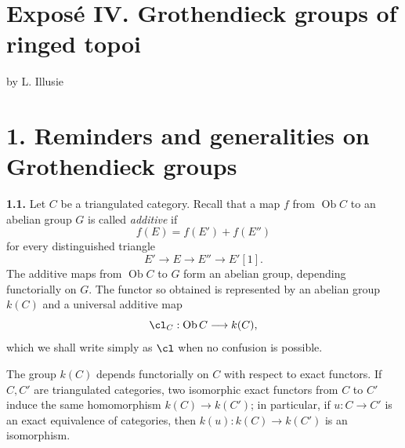 \providecommand{\Ob}{\operatorname{Ob}}
\providecommand{\Mod}{\operatorname{Mod}}
\providecommand{\Coh}{\operatorname{Coh}}
\providecommand{\Loclib}{\operatorname{Loclib}}
\providecommand{\coh}{\mathrm{coh}}
\providecommand{\parf}{\mathrm{parf}}
\providecommand{\naif}{\mathrm{naif}}
\providecommand{\loc}{\mathrm{loc}}
\providecommand{\fin}{\mathrm{fin}}
\providecommand{\clA}{\operatorname{cl}}
\providecommand{\Rg}{\operatorname{rg}}
\providecommand{\varinjlim}{\varinjlim}
\providecommand{\varprojlim}{\varprojlim}
\providecommand{\id}{\operatorname{id}}
\providecommand{\Th}{\operatorname{Th}}
\providecommand{\Hom}{\operatorname{Hom}}
\providecommand{\Dcat}{\mathrm D}
\providecommand{\Kcat}{\mathrm K}
\providecommand{\Kdot}{K_{\bullet}}
\providecommand{\Kprime}{K'}
\providecommand{\naif}{\mathrm{na\ddot{\i}f}}


\section*{Exposé IV. Grothendieck groups of ringed topoi}
\begin{center}
by L. Illusie
\end{center}

\section*{1. Reminders and generalities on Grothendieck groups}

\textbf{1.1.} Let \(C\) be a triangulated category. Recall that a map \(f\) from \(\Ob C\) to an abelian group \(G\) is called \emph{additive} if
\[
 f(E)=f(E')+f(E'')
\]
for every distinguished triangle
\[
 E'\longrightarrow E\longrightarrow E''\longrightarrow E'[1].
\]
The additive maps from \(\Ob C\) to \(G\) form an abelian group, depending functorially on \(G\). The functor so obtained is represented by an abelian group \(k(C)\) and a universal additive map
\[
 \cl_C:\Ob C\longrightarrow k(C),
\]
which we shall write simply as \(\cl\) when no confusion is possible.

The group \(k(C)\) depends functorially on \(C\) with respect to exact functors. If \(C,C'\) are triangulated categories, two isomorphic exact functors from \(C\) to \(C'\) induce the same homomorphism \(k(C)\to k(C')\); in particular, if \(u:C\to C'\) is an exact equivalence of categories, then \(k(u):k(C)\to k(C')\) is an isomorphism.

